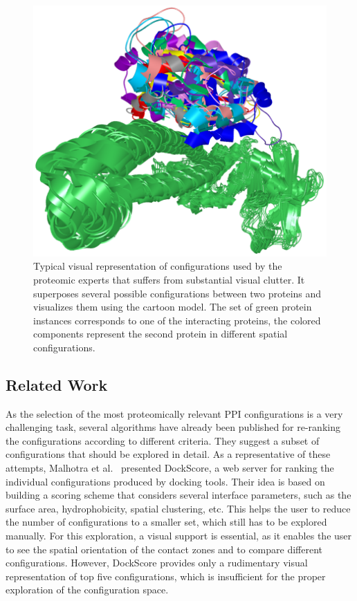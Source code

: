 \documentclass[twocolumn]{bmcart}%
\begin{document}
\begin{figure}[tb]
  \centering
  \includegraphics[width=0.9\columnwidth]{images/figure1.png}
 \caption{
	Typical visual representation of configurations used by the proteomic experts that suffers from substantial visual clutter. It superposes several possible configurations between two proteins and visualizes them using the cartoon model. The set of green protein instances corresponds to one of the interacting proteins, the colored components represent the second protein in different spatial configurations.}
  \label{fig:problem}
\end{figure}



\subsection*{Related Work}
As the selection of the most proteomically relevant PPI configurations is a very challenging task, several algorithms have already been published for re-ranking the configurations according to different criteria.
They suggest a subset of configurations that should be explored in detail.
As a representative of these attempts, Malhotra et al.~\cite{Malhotra2015} presented DockScore, a web server for ranking the individual configurations produced by docking tools. 
Their idea is based on building a scoring scheme that considers several interface parameters, such as the surface area, hydrophobicity, spatial clustering, etc.
This helps the user to reduce the number of configurations to a smaller set, which still has to be explored manually.
For this exploration, a visual support is essential, as it enables the user to see the spatial orientation of the contact zones and to compare different configurations.
However, DockScore provides only a rudimentary visual representation of top five configurations, which is insufficient for the proper exploration of the configuration space.
 
\end{document}
